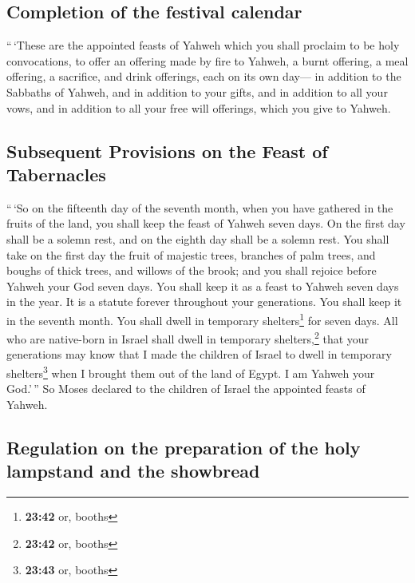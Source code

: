 \hypertarget{completion-of-the-festival-calendar}{%
\subsection{Completion of the festival
calendar}\label{completion-of-the-festival-calendar}}

 ``\,`These are the appointed feasts of Yahweh which you
shall proclaim to be holy convocations, to offer an offering made by
fire to Yahweh, a burnt offering, a meal offering, a sacrifice, and
drink offerings, each on its own day---  in addition to
the Sabbaths of Yahweh, and in addition to your gifts, and in addition
to all your vows, and in addition to all your free will offerings, which
you give to Yahweh.

\hypertarget{subsequent-provisions-on-the-feast-of-tabernacles}{%
\subsection{Subsequent Provisions on the Feast of
Tabernacles}\label{subsequent-provisions-on-the-feast-of-tabernacles}}

 ``\,`So on the fifteenth day of the seventh month, when
you have gathered in the fruits of the land, you shall keep the feast of
Yahweh seven days. On the first day shall be a solemn rest, and on the
eighth day shall be a solemn rest.  You shall take on the
first day the fruit of majestic trees, branches of palm trees, and
boughs of thick trees, and willows of the brook; and you shall rejoice
before Yahweh your God seven days.  You shall keep it as
a feast to Yahweh seven days in the year. It is a statute forever
throughout your generations. You shall keep it in the seventh month.
 You shall dwell in temporary shelters\footnote{\textbf{23:42}
  or, booths} for seven days. All who are native-born in Israel shall
dwell in temporary shelters,\footnote{\textbf{23:42} or, booths}
 that your generations may know that I made the children
of Israel to dwell in temporary shelters\footnote{\textbf{23:43} or,
  booths} when I brought them out of the land of Egypt. I am Yahweh your
God.'\,''  So Moses declared to the children of Israel
the appointed feasts of Yahweh.

\hypertarget{regulation-on-the-preparation-of-the-holy-lampstand-and-the-showbread}{%
\subsection{Regulation on the preparation of the holy lampstand and the
showbread}\label{regulation-on-the-preparation-of-the-holy-lampstand-and-the-showbread}}

